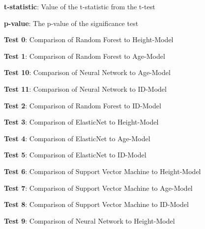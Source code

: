 \documentclass[11pt]{article}
\begin{document}
\begin{codeoutput}
\begin{table}[h]
\begin{threeparttable}
\begin{tablenotes}
\item \textbf{t-statistic}: Value of the t-statistic from the t-test
\item \textbf{p-value}: The p-value of the significance test
\item \textbf{Test 0}: Comparison of Random Forest to Height-Model
\item \textbf{Test 1}: Comparison of Random Forest to Age-Model
\item \textbf{Test 10}: Comparison of Neural Network to Age-Model
\item \textbf{Test 11}: Comparison of Neural Network to ID-Model
\item \textbf{Test 2}: Comparison of Random Forest to ID-Model
\item \textbf{Test 3}: Comparison of ElasticNet to Height-Model
\item \textbf{Test 4}: Comparison of ElasticNet to Age-Model
\item \textbf{Test 5}: Comparison of ElasticNet to ID-Model
\item \textbf{Test 6}: Comparison of Support Vector Machine to Height-Model
\item \textbf{Test 7}: Comparison of Support Vector Machine to Age-Model
\item \textbf{Test 8}: Comparison of Support Vector Machine to ID-Model
\item \textbf{Test 9}: Comparison of Neural Network to Height-Model
\end{tablenotes}
\end{threeparttable}
\end{table}
\end{codeoutput}
\end{document}
